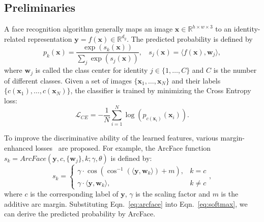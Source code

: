 \documentclass[letterpaper]{article} %
\begin{document}
\subsection{Preliminaries}
\label{ssec:preliminary}
%
A face recognition algorithm generally maps an image $\bm{x} \in \mathbb{R}^{h\times w\times 3}$ to an identity-related representation $\bm{y} = f(\bm{x}) \in \mathbb{R}^{d_y}$. %
The predicted probability is defined by
\begin{equation}
  p_k(\bm{x}) = \frac{\exp (s_k(\bm{x}))}{\sum_j \exp(s_j(\bm{x}))},~~~~s_j(\bm{x}) = \langle f(\bm{x}), \bm{w}_j\rangle,
  \label{eq:softmax}
\end{equation}
%
where $\bm{w}_j$ is called the class center for identity $j \in \{1, \dots, C\}$ and $C$ is the number of different classes.
%
Given a set of images $\{\bm{x}_1,\dots, \bm{x}_N\}$ and their labels $\{c(\bm{x}_1), \dots, c(\bm{x}_N)\}$, the classifier is trained by minimizing the Cross Entropy loss:
\begin{equation}
  \mathcal{L}_{CE} = -\frac{1}{N} \sum_{i = 1}^{N} \log \left(p_{c(\bm{x}_i)}(\bm{x}_i)\right).
  \label{eq:cross_entropy}
\end{equation}

To improve the discriminative ability of the learned features, various margin-enhanced losses~\cite{deng2019arcface,wang2018cosface} are proposed. %
%
For example, the ArcFace function $s_k = ArcFace(\bm{y}, c, \{\bm{w}_j\}, k; \gamma, \theta)$ is defined by:
\begin{equation}
  s_k =
  \begin{cases}
    \gamma \cdot \cos( \cos^{-1}( \langle \bm{y}, \bm{w}_k \rangle) + m), & k = c\\
    \gamma \cdot \langle \bm{y}, \bm{w}_k \rangle, & k \neq c
  \end{cases},
  \label{eq:arcface}
\end{equation}
where $c$ is the corresponding label of $\bm{y}$, $\gamma$ is the scaling factor and $m$ is the additive arc margin.
%
Substituting Eqn.~\ref{eq:arcface} into Eqn.~\ref{eq:softmax}, we can derive the predicted probability by ArcFace.
%
\end{document}
